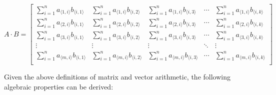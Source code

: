 \begin{tcolorbox}[title={\textbf{\tboxdef{\ref*{subsec:matrix-arithmetic}} Matrix Arithmetic}}]
\begin{itemize}
$A \cdot B = \begin{bmatrix}
\sum\limits_{i=1}^{n}a_{\langle 1, i\rangle}b_{\langle i, 1\rangle} & \sum\limits_{i=1}^{n}a_{\langle 1, i\rangle}b_{\langle i, 2\rangle} & \sum\limits_{i=1}^{n}a_{\langle 1, i\rangle}b_{\langle i, 3\rangle} & \cdots & \sum\limits_{i=1}^{n}a_{\langle 1, i\rangle}b_{\langle i, k\rangle} \\
\sum\limits_{i=1}^{n}a_{\langle 2, i\rangle}b_{\langle i, 1\rangle} & \sum\limits_{i=1}^{n}a_{\langle 2, i\rangle}b_{\langle i, 2\rangle} & \sum\limits_{i=1}^{n}a_{\langle 2, i\rangle}b_{\langle i, 3\rangle} & \cdots & \sum\limits_{i=1}^{n}a_{\langle 2, i\rangle}b_{\langle i, k\rangle} \\
\sum\limits_{i=1}^{n}a_{\langle 3, i\rangle}b_{\langle i, 1\rangle} & \sum\limits_{i=1}^{n}a_{\langle 3, i\rangle}b_{\langle i, 2\rangle} & \sum\limits_{i=1}^{n}a_{\langle 3, i\rangle}b_{\langle i, 3\rangle} & \cdots & \sum\limits_{i=1}^{n}a_{\langle 3, i\rangle}b_{\langle i, k\rangle} \\
\vdots & \vdots & \vdots & \ddots & \vdots \\
\sum\limits_{i=1}^{n}a_{\langle m, i\rangle}b_{\langle i, 1\rangle}
& \sum\limits_{i=1}^{n}a_{\langle m, i\rangle}b_{\langle i, 2\rangle} & \sum\limits_{i=1}^{n}a_{\langle m, i\rangle}b_{\langle i, 3\rangle} & \cdots & \sum\limits_{i=1}^{n}a_{\langle m, i\rangle}b_{\langle i, k\rangle} \\
\end{bmatrix}$


\end{itemize}
\end{tcolorbox}

Given the above definitions of matrix and vector arithmetic, the following algebraic properties can be derived:


